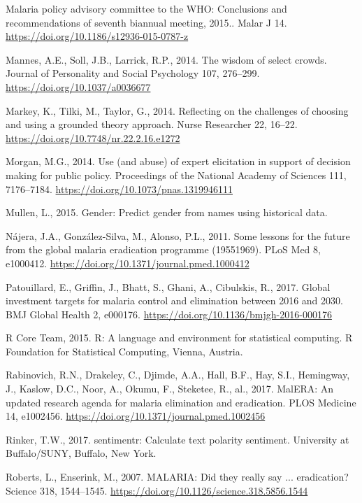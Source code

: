 \documentclass[]{article}
\begin{document}
\hypertarget{ref-WHO2015}{}
Malaria policy advisory committee to the WHO: Conclusions and
recommendations of seventh biannual meeting, 2015.. Malar J 14.
\url{https://doi.org/10.1186/s12936-015-0787-z}

\hypertarget{ref-Mannes_2014}{}
Mannes, A.E., Soll, J.B., Larrick, R.P., 2014. The wisdom of select
crowds. Journal of Personality and Social Psychology 107, 276--299.
\url{https://doi.org/10.1037/a0036677}

\hypertarget{ref-Markey_2014}{}
Markey, K., Tilki, M., Taylor, G., 2014. Reflecting on the challenges of
choosing and using a grounded theory approach. Nurse Researcher 22,
16--22. \url{https://doi.org/10.7748/nr.22.2.16.e1272}

\hypertarget{ref-Morgan_2014}{}
Morgan, M.G., 2014. Use (and abuse) of expert elicitation in support of
decision making for public policy. Proceedings of the National Academy
of Sciences 111, 7176--7184.
\url{https://doi.org/10.1073/pnas.1319946111}

\hypertarget{ref-Lincoln}{}
Mullen, L., 2015. Gender: Predict gender from names using historical
data.

\hypertarget{ref-Njera2011}{}
Nájera, J.A., González-Silva, M., Alonso, P.L., 2011. Some lessons for
the future from the global malaria eradication programme (19551969).
PLoS Med 8, e1000412. \url{https://doi.org/10.1371/journal.pmed.1000412}

\hypertarget{ref-Patouillard2017}{}
Patouillard, E., Griffin, J., Bhatt, S., Ghani, A., Cibulskis, R., 2017.
Global investment targets for malaria control and elimination between
2016 and 2030. BMJ Global Health 2, e000176.
\url{https://doi.org/10.1136/bmjgh-2016-000176}

\hypertarget{ref-R}{}
R Core Team, 2015. R: A language and environment for statistical
computing. R Foundation for Statistical Computing, Vienna, Austria.

\hypertarget{ref-Rabinovich_2017}{}
Rabinovich, R.N., Drakeley, C., Djimde, A.A., Hall, B.F., Hay, S.I.,
Hemingway, J., Kaslow, D.C., Noor, A., Okumu, F., Steketee, R., al.,
2017. MalERA: An updated research agenda for malaria elimination and
eradication. PLOS Medicine 14, e1002456.
\url{https://doi.org/10.1371/journal.pmed.1002456}

\hypertarget{ref-sentimentr2017}{}
Rinker, T.W., 2017. sentimentr: Calculate text polarity sentiment.
University at Buffalo/SUNY, Buffalo, New York.

\hypertarget{ref-Roberts2007}{}
Roberts, L., Enserink, M., 2007. MALARIA: Did they really say ...
eradication? Science 318, 1544--1545.
\url{https://doi.org/10.1126/science.318.5856.1544}
\end{document}
